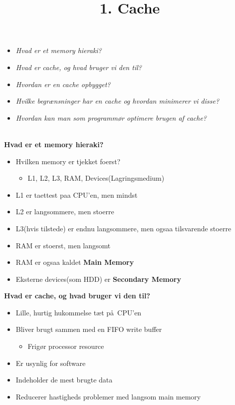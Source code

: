 \documentclass{paper}
\title{1. Cache}
\begin{document}
\maketitle
\begin{itemize}
\item \textit{Hvad er et memory hieraki?}
\item \textit{Hvad er cache, og hvad bruger vi den til?}
\item \textit{Hvordan er en cache opbygget?}
\item \textit{Hvilke begr\ae nsninger har en cache og hvordan minimerer vi disse?}
\item \textit{Hvordan kan man som programm\o r optimere brugen af cache? \\ \\}
\end{itemize}

\begin{large}\textbf{Hvad er et memory hieraki?} \end{large}
\begin{itemize}
	\item Hvilken memory er tjekket foerst?
	\begin{itemize}
		\item L1, L2, L3, RAM, Devices(Lagringsmedium)
	\end{itemize}
	\item L1 er taettest paa CPU'en, men mindst
	\item L2 er langsommere, men stoerre
	\item L3(hvis tilstede) er endnu langsommere, men ogsaa tilsvarende stoerre
	\item RAM er stoerst, men langsomt
	\item RAM er ogsaa kaldet \textbf{Main Memory}
	\item Eksterne devices(som HDD) er \textbf{Secondary Memory}
\end{itemize}

\begin{large}\textbf{Hvad er cache, og hvad bruger vi den til?} \end{large}
\begin{itemize}
\item Lille, hurtig hukommelse t\ae t p\aa\ CPU'en
\item Bliver brugt sammen med en FIFO write buffer
	\begin{itemize}
	\item Frig\o r processor resource
	\end{itemize}
\item Er usynlig for software
\item Indeholder de mest brugte data
\item Reducerer hastigheds problemer med langsom main memory
\end{itemize}
\end{document}
